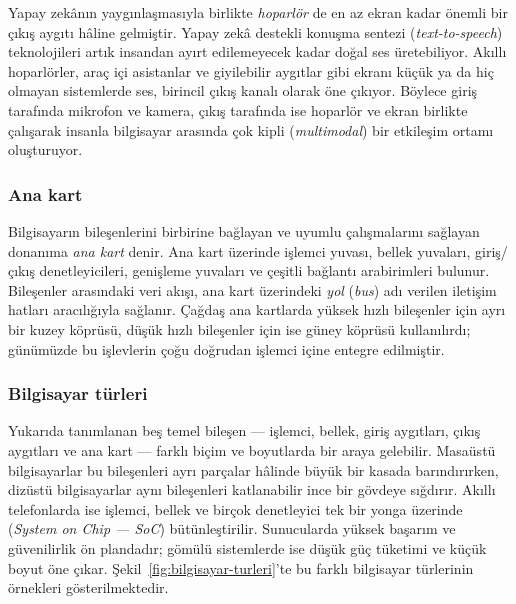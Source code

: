 Yapay zekânın yaygınlaşmasıyla birlikte \emph{hoparlör} de en az ekran kadar önemli bir çıkış aygıtı hâline gelmiştir. Yapay zekâ destekli konuşma sentezi (\emph{text-to-speech}) teknolojileri artık insandan ayırt edilemeyecek kadar doğal ses üretebiliyor. Akıllı hoparlörler, araç içi asistanlar ve giyilebilir aygıtlar gibi ekranı küçük ya da hiç olmayan sistemlerde ses, birincil çıkış kanalı olarak öne çıkıyor. Böylece giriş tarafında mikrofon ve kamera, çıkış tarafında ise hoparlör ve ekran birlikte çalışarak insanla bilgisayar arasında çok kipli (\emph{multimodal}) bir etkileşim ortamı oluşturuyor.

\subsubsection*{Ana kart}
Bilgisayarın bileşenlerini birbirine bağlayan ve uyumlu çalışmalarını sağlayan donanıma \emph{ana kart} denir. Ana kart üzerinde işlemci yuvası, bellek yuvaları, giriş/çıkış denetleyicileri, genişleme yuvaları ve çeşitli bağlantı arabirimleri bulunur. Bileşenler arasındaki veri akışı, ana kart üzerindeki \emph{yol} (\emph{bus}) adı verilen iletişim hatları aracılığıyla sağlanır. Çağdaş ana kartlarda yüksek hızlı bileşenler için ayrı bir kuzey köprüsü, düşük hızlı bileşenler için ise güney köprüsü kullanılırdı; günümüzde bu işlevlerin çoğu doğrudan işlemci içine entegre edilmiştir.

\subsubsection*{Bilgisayar türleri}
Yukarıda tanımlanan beş temel bileşen --- işlemci, bellek, giriş aygıtları, çıkış aygıtları ve ana kart --- farklı biçim ve boyutlarda bir araya gelebilir. Masaüstü bilgisayarlar bu bileşenleri ayrı parçalar hâlinde büyük bir kasada barındırırken, dizüstü bilgisayarlar aynı bileşenleri katlanabilir ince bir gövdeye sığdırır. Akıllı telefonlarda ise işlemci, bellek ve birçok denetleyici tek bir yonga üzerinde (\emph{System on Chip --- SoC}) bütünleştirilir. Sunucularda yüksek başarım ve güvenilirlik ön plandadır; gömülü sistemlerde ise düşük güç tüketimi ve küçük boyut öne çıkar. Şekil~\ref{fig:bilgisayar-turleri}'te bu farklı bilgisayar türlerinin örnekleri gösterilmektedir.

